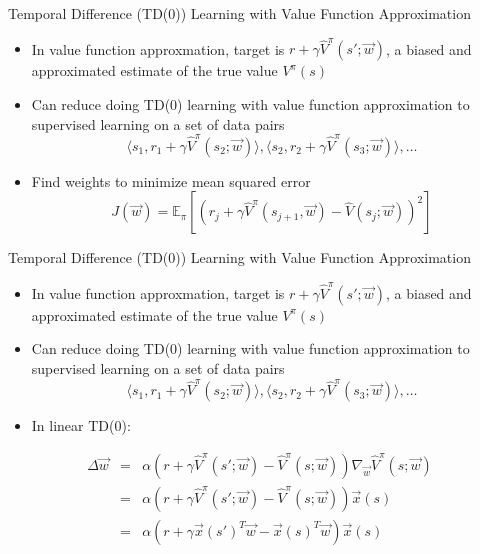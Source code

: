 \begin{frame}[c]{Temporal Difference (TD(0)) Learning with Value
		Function Approximation}
	
	\begin{itemize}
		\item In value function approxmation, target is $r + \gamma \hat{V}^\pi (s'; \vec{w})$, a biased and approximated estimate of the true value $V^\pi(s)$
		\item Can reduce doing TD(0) learning with value function approximation to supervised learning on a set of data pairs
		$$\langle  s_1, r_1+ \gamma \hat{V}^\pi (s_2; \vec{w}) \rangle, \langle  s_2, r_2+ \gamma \hat{V}^\pi (s_3; \vec{w}) \rangle, \ldots $$
		\item Find weights to minimize mean squared error
		$$J(\vec{w}) = \mathbb{E}_\pi [(r_j + \gamma \hat{V}^\pi(s_{j+1}, \vec{w}) - \hat{V}(s_j;\vec{w}))^2]$$
	\end{itemize}
	
\end{frame}
\begin{frame}[c]{Temporal Difference (TD(0)) Learning with Value
		Function Approximation}
	
	\begin{itemize}
		\item In value function approxmation, target is $r + \gamma \hat{V}^\pi (s'; \vec{w})$, a biased and approximated estimate of the true value $V^\pi(s)$
		\item Can reduce doing TD(0) learning with value function approximation to supervised learning on a set of data pairs
		$$\langle  s_1, r_1+ \gamma \hat{V}^\pi (s_2; \vec{w}) \rangle, \langle  s_2, r_2+ \gamma \hat{V}^\pi (s_3; \vec{w}) \rangle, \ldots $$
		\item In linear TD(0):
	\end{itemize}

\begin{eqnarray}
\Delta \vec{w} &=& \alpha( r + \gamma \hat{V}^\pi(s'; \vec{w}) - \hat{V}^\pi(s;\vec{w})) \nabla_\vec{w} \hat{V}^\pi (s;\vec{w})\nonumber\\
&=& \alpha( r + \gamma \hat{V}^\pi(s'; \vec{w}) - \hat{V}^\pi(s;\vec{w})) \vec{x}(s)\nonumber\\
&=& \alpha( r + \gamma \vec{x}(s')^T \vec{w} - \vec{x}(s)^T\vec{w}) \vec{x}(s)\nonumber
\end{eqnarray}
	
\end{frame}

